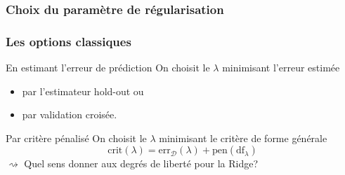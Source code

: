 \documentclass{beamer}\usepackage[]{graphicx}\usepackage[]{color}
\begin{document}
\subsubsection{Choix du paramètre de régularisation}

\begin{frame}
   \frametitle{Les options classiques}

\begin{block}{En estimant l'erreur de prédiction}
On choisit le $\lambda$ minimisant l'erreur estimée
\begin{itemize}
\item par l'estimateur hold-out ou
\item par validation croisée.
\end{itemize}
\end {block}

\vfill

\begin{block}{Par critère pénalisé}
On choisit le $\lambda$ minimisant le critère de forme générale
\begin{equation*}
\mathrm{crit}(\lambda) = \mathrm{err}_\mathcal{D}(\lambda) + \mathrm{pen}(\mathrm{df}_\lambda)
\end{equation*}
$\rightsquigarrow$ Quel sens donner aux degrés de liberté pour la Ridge?
\end {block}

\end{frame}
\end{document}
